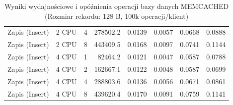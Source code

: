 \begin{table}[ht]
{\begin{tabular}{llcrrrrr}
Zapis (Insert) & 2 CPU & 4 & 278502.2 & 0.0139 & 0.0057 & 0.0668 & 0.0888 \\
Zapis (Insert) & 2 CPU & 8 & 443409.5 & 0.0168 & 0.0097 & 0.0741 & 0.1144 \\
Zapis (Insert) & 4 CPU & 1 & 82464.2 & 0.0121 & 0.0047 & 0.0587 & 0.0788 \\
Zapis (Insert) & 4 CPU & 2 & 162667.1 & 0.0122 & 0.0048 & 0.0587 & 0.0699 \\
Zapis (Insert) & 4 CPU & 4 & 288803.6 & 0.0136 & 0.0056 & 0.0671 & 0.0861 \\
Zapis (Insert) & 4 CPU & 8 & 439620.4 & 0.0170 & 0.0091 & 0.0759 & 0.1141 \\
\bottomrule
\end{tabular}%
}
\caption{Wyniki wydajnościowe i opóźnienia operacji bazy danych MEMCACHED (Rozmiar rekordu: 128 B, 100k operacji/klient)}
\label{tab:latency_memcached_small_100000}
\end{table}
